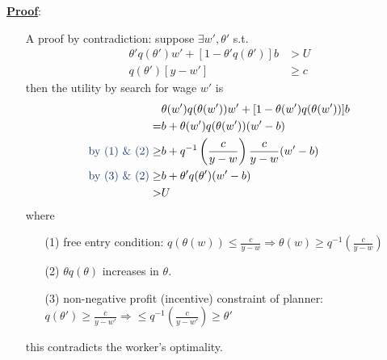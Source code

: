 \documentclass[10pt,landscape,a4paper]{article}
\begin{document}
\begin{multicols*}{3}
\vspace{2pt}

\underline{\textbf{Proof}}:
\begin{itemize}
    \item[A] proof by contradiction: suppose $\exists w',\theta'$ s.t.
    \begin{align*}
        \theta'q(\theta')w'+[1-\theta'q(\theta')]b &>U \\
        q(\theta')[y-w']&\geq c
    \end{align*}
    then the utility by search for wage $w'$ is
    \begin{align*}
        &\theta(w') q(\theta(w'))w'+[1-\theta(w') q(\theta(w'))]b\\
        =& b+ \theta(w') q(\theta(w'))(w'-b)\\
        \text{\color{myblue}by (1) \& (2)} \geq & b+ q^{-1}\left(\frac{c}{y-w}\right)\frac{c}{y-w}(w'-b)\\
        \text{\color{myblue}by (3) \& (2)} \geq & b+\theta'q(\theta')(w'-b)\\
        >&U
    \end{align*}
    where
    \begin{itemize}
        \item[(1)] free entry condition: $q(\theta(w))\leq \frac{c}{y-w}\Rightarrow\theta(w)\geq q^{-1}\left(\frac{c}{y-w}\right)$ 
        \item[(2)] $\theta q(\theta)$ increases in $\theta$.
        \item[(3)] non-negative profit (incentive) constraint of planner: $q(\theta')\geq \frac{c}{y-w'}\Rightarrow \leq q^{-1}\left(\frac{c}{y-w'}\right)\geq \theta'$
    \end{itemize}
    this contradicts the worker's optimality.
    

\end{itemize}
\end{multicols*}
\end{document}
